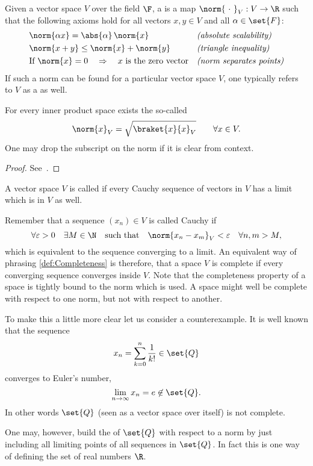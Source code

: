 \begin{defn}
	Given a vector space $V$ over the field $\F$, a  is a map
	$\norm{~\cdot~}_V : V \to \R$
	such that the following axioms hold for all vectors $x,y \in V$ and all $\alpha \in \set{F}$:
	\begin{align}
		\label{eqn:normScalability}
			&\norm{\alpha x} = \abs{\alpha} \, \norm{x} &&
			\text{\textit{(absolute scalability)}} \\
		\label{eqn:normTriaIneq}
			&\norm{x + y} \le \norm{x} + \norm{y} &&
			\text{\textit{(triangle inequality)}} \\
		\label{eqn:normPointSep}
			&\text{If}~\norm{x} = 0 \quad \Rightarrow
			\quad \text{$x$ is the zero vector} &&
			\text{\textit{(norm separates points)}}
	\end{align}
	If such a norm can be found for a particular vector space $V$,
	one typically refers to $V$ as a  as well.
\end{defn}

\begin{prop}
	For every inner product space exists the so-called 
	\begin{equation}
		\norm{x}_V = \sqrt{ \braket{x}{x}_V } \qquad \forall x \in V.
		\label{eqn:normInduced}
	\end{equation}
	One may drop the subscript on the norm
	if it is clear from context.
	\begin{proof}
		See~\cite{DiracNotation}.
	\end{proof}
\end{prop}

\begin{defn}
	\label{def:Completeness}
	A vector space $V$ is called  if every Cauchy sequence
	of vectors in  $V$ has a limit which is in $V$ as well.
\end{defn}
Remember that a sequence $(x_n) \in V$ is called Cauchy if
\[ \forall \varepsilon > 0 \quad
	\exists M \in \N \quad \text{such that} \quad
	\norm{x_n - x_m}_V < \varepsilon \quad \forall n,m > M,
\]
which is equivalent to the sequence converging to a limit.
An equivalent way of phrasing  \vref{def:Completeness}
is therefore,
that a space $V$ is complete if every converging sequence
converges inside $V$.
Note that the completeness property of a space is
tightly bound to the norm which is used.
A space might well be complete with respect to one norm,
but not with respect to another.

\begin{exmp}
	To make this a little more clear let us consider a counterexample.
	It is well known that the sequence
	\[ x_n = \sum_{k=0}^n \frac{1}{k!} \in \set{Q} \]
	converges to Euler's number, \ie
	\[ \lim_{n\to\infty} x_n = e \not\in \set{Q}. \]
	In other words $\set{Q}$ (seen as a vector space over itself)
	is not complete.

	One may, however, build the  of $\set{Q}$
	with respect to a norm by just including all limiting points of
	all sequences in $\set{Q}$. In fact this is one way
	of defining the set of real numbers $\R$.
\end{exmp}

